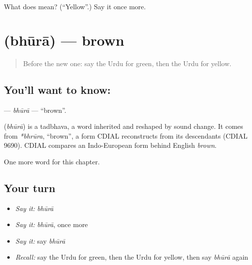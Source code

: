 \begin{tcolorbox}[breakable,colback=teal!4,colframe=teal!35!black,title={Before you move on}]
What does  mean? (\textquotedblleft{}Yellow\textquotedblright{}.) Say it once more.
\end{tcolorbox}
\section[\texorpdfstring{\ur{بھورا} (bhūrā)}{بھورا (bhūrā)}]{ (bhūrā) — brown}

\label{lesson:UR-C74-bhura}



\begin{quote}
Before the new one: say the Urdu for green, then the Urdu for yellow.
\end{quote}

\subsection*{You'll want to know: }
\textbf{} — \emph{bhūrā} — \textquotedblleft{}brown\textquotedblright{}.

\begin{cousinweb}
\textbf{} (\emph{bhūrā}) is a tadbhava, a word inherited and reshaped by sound change. It comes from \emph{*bhrūra}, \textquotedblleft{}brown\textquotedblright{}, a form CDIAL reconstructs from its descendants (CDIAL 9690). CDIAL compares an Indo-European form behind English \emph{brown}.
\end{cousinweb}

\begin{grammarlens}[title={What you've built}]
One more word for this chapter.
\end{grammarlens}

\subsection*{Your turn}
\begin{itemize}
\raggedright
  \item \emph{Say it:} \emph{bhūrā}
  \item \emph{Say it:} \emph{bhūrā}, once more
  \item \emph{Say it:} say \emph{bhūrā}
  \item \emph{Recall:} say the Urdu for green, then the Urdu for yellow, then say \emph{bhūrā} again
\end{itemize}

